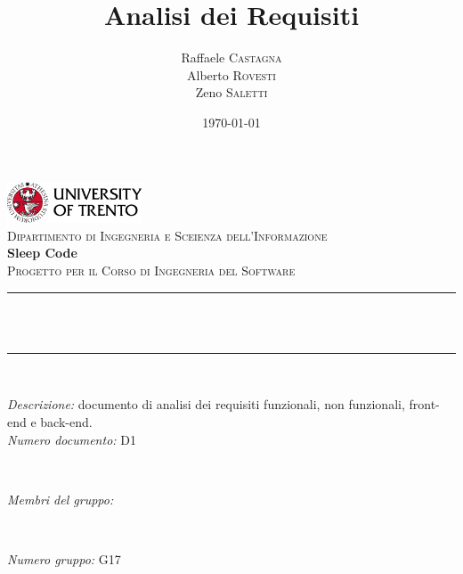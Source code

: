 \documentclass[11pt, a4paper]{article}
\title{Analisi dei Requisiti}
\author{Raffaele \textsc{Castagna}\\
Alberto \textsc{Rovesti}\\
Zeno \textsc{Saletti}}
\date{\today}
\newcommand{\groupNumber}{G17}
\begin{document}
\begin{titlepage}
\newcommand{\HRule}{\rule{\linewidth}{0.3mm}} %
\center %


\includegraphics[width=0.3\textwidth]{./unioftrento.png}\\[0.5cm]
\textsc{\Large Dipartimento di Ingegneria e Sceienza dell'Informazione}\\[1.5cm]

{\Huge\textbf{Sleep Code}}\\[0.5cm]
\textsc{\large Progetto per il Corso di Ingegneria del Software}\\[0.5cm]


\HRule\\[0.4cm]
{\huge\bfseries \@title}\\[0.1cm]
\HRule\\[1cm]

\begin{minipage}{\textwidth}
\begin{flushleft}
\textit{Descrizione:} documento di analisi dei requisiti funzionali, non funzionali, front-end e back-end.\\
\textit{Numero documento:} D1
\end{flushleft}
\end{minipage}\\[1.5cm]



\begin{minipage}{0.4\textwidth}
\begin{flushleft}
\large
\textit{Membri del gruppo:}\\
\@author %
\end{flushleft}
\end{minipage}
~
\begin{minipage}{0.4\textwidth}
\begin{flushright}
\large
\textit{Numero gruppo: }
\groupNumber
\end{flushright}
\end{minipage}


\end{titlepage}
\end{document}
